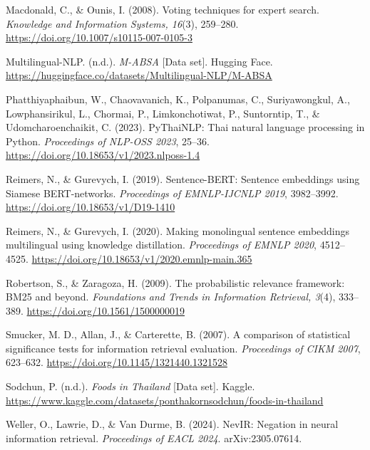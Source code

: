 Macdonald, C., \& Ounis, I. (2008). Voting techniques for expert search. \emph{Knowledge
and Information Systems, 16}(3), 259--280.
\url{https://doi.org/10.1007/s10115-007-0105-3}

Multilingual-NLP. (n.d.). \emph{M-ABSA} [Data set]. Hugging Face.
\url{https://huggingface.co/datasets/Multilingual-NLP/M-ABSA}

Phatthiyaphaibun, W., Chaovavanich, K., Polpanumas, C., Suriyawongkul, A., Lowphansirikul,
L., Chormai, P., Limkonchotiwat, P., Suntorntip, T., \& Udomcharoenchaikit, C. (2023).
PyThaiNLP: Thai natural language processing in Python. \emph{Proceedings of NLP-OSS 2023},
25--36. \url{https://doi.org/10.18653/v1/2023.nlposs-1.4}

Reimers, N., \& Gurevych, I. (2019). Sentence-BERT: Sentence embeddings using Siamese
BERT-networks. \emph{Proceedings of EMNLP-IJCNLP 2019}, 3982--3992.
\url{https://doi.org/10.18653/v1/D19-1410}

Reimers, N., \& Gurevych, I. (2020). Making monolingual sentence embeddings multilingual using
knowledge distillation. \emph{Proceedings of EMNLP 2020}, 4512--4525.
\url{https://doi.org/10.18653/v1/2020.emnlp-main.365}

Robertson, S., \& Zaragoza, H. (2009). The probabilistic relevance framework: BM25 and beyond.
\emph{Foundations and Trends in Information Retrieval, 3}(4), 333--389.
\url{https://doi.org/10.1561/1500000019}

Smucker, M. D., Allan, J., \& Carterette, B. (2007). A comparison of statistical significance
tests for information retrieval evaluation. \emph{Proceedings of CIKM 2007}, 623--632.
\url{https://doi.org/10.1145/1321440.1321528}

Sodchun, P. (n.d.). \emph{Foods in Thailand} [Data set]. Kaggle.
\url{https://www.kaggle.com/datasets/ponthakornsodchun/foods-in-thailand}

Weller, O., Lawrie, D., \& Van Durme, B. (2024). NevIR: Negation in neural information
retrieval. \emph{Proceedings of EACL 2024}. arXiv:2305.07614.

